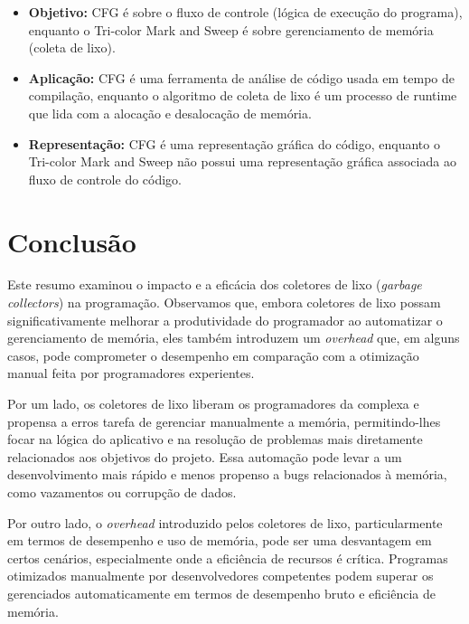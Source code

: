 \documentclass{article}
\begin{document}
    \begin{itemize}
        \item \textbf{Objetivo:} CFG é sobre o fluxo de controle (lógica de execução do programa), enquanto o
        Tri-color Mark and Sweep é sobre gerenciamento de memória (coleta de lixo).

        \item \textbf{Aplicação:} CFG é uma ferramenta de análise de código usada em tempo de compilação,
        enquanto o algoritmo de coleta de lixo é um processo de runtime que lida com a alocação e desalocação de memória.

        \item \textbf{Representação:} CFG é uma representação gráfica do código, enquanto o Tri-color Mark
        and Sweep não possui uma representação gráfica associada ao fluxo de controle do código.

    \end{itemize}

    \section*{Conclusão}

    Este resumo examinou o impacto e a eficácia dos coletores de lixo (\emph{garbage collectors}) na programação.
    Observamos que, embora coletores de lixo possam significativamente melhorar a produtividade do programador
    ao automatizar o gerenciamento de memória, eles também introduzem um \emph{overhead} que, em alguns casos, pode
    comprometer o desempenho em comparação com a otimização manual feita por programadores experientes.

    Por um lado, os coletores de lixo liberam os programadores da complexa e propensa a erros tarefa de
    gerenciar manualmente a memória, permitindo-lhes focar na lógica do aplicativo e na resolução de problemas
    mais diretamente relacionados aos objetivos do projeto. Essa automação pode levar a um desenvolvimento mais
    rápido e menos propenso a bugs relacionados à memória, como vazamentos ou corrupção de dados.

    Por outro lado, o \emph{overhead} introduzido pelos coletores de lixo, particularmente em termos de desempenho e uso
    de memória, pode ser uma desvantagem em certos cenários, especialmente onde a eficiência de recursos é crítica.
    Programas otimizados manualmente por desenvolvedores competentes podem superar os gerenciados automaticamente em
    termos de desempenho bruto e eficiência de memória.
\end{document}
